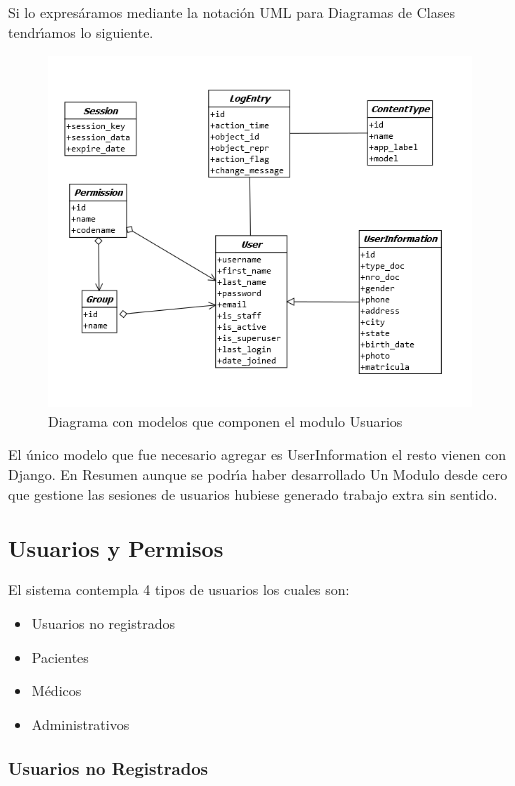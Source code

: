 Si lo expres\'aramos mediante la notaci\'on UML para Diagramas de Clases 
tendr\'{\i}amos lo siguiente.

\begin{figure}[H]
    \centering
    \includegraphics[scale=0.7]{resourse/uml-users.png}
    \caption{Diagrama con modelos que componen el modulo Usuarios}
    \label{fig:07}
\end{figure}

El \'unico modelo que fue necesario agregar es UserInformation el resto vienen
con Django. En Resumen aunque se podr\'{\i}a haber desarrollado Un Modulo desde
cero que gestione las sesiones de usuarios hubiese generado trabajo extra sin
sentido.

\subsection{Usuarios y Permisos}

El sistema contempla 4 tipos de usuarios los cuales son: 

\begin{itemize}
    \item Usuarios no registrados 
    \item Pacientes
    \item M\'edicos
    \item Administrativos
\end{itemize}

\subsubsection{Usuarios no Registrados}

